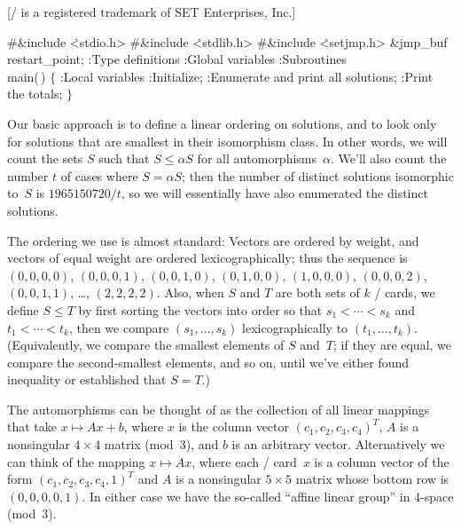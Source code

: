 [\SET/ is a registered trademark of SET Enterprises, Inc.]

\Y\B\8\#\&{include} \.{<stdio.h>}\6
\8\#\&{include} \.{<stdlib.h>}\6
\8\#\&{include} \.{<setjmp.h>}\6
\&{jmp\_buf} \\{restart\_point};\7
:Type definitions\X\6
:Global variables\X\6
:Subroutines\X\7
\\{main}(\,)\1\1\2\2\6
${}\{{}$\1\6
:Local variables\X\6
:Initialize\X;\6
:Enumerate and print all solutions\X;\6
:Print the totals\X;\6
\4${}\}{}$\2\par
\fi

Our basic approach is to define a linear ordering on
solutions, and to
look only for solutions that are smallest in their isomorphism class.
In other words, we will count the sets $S$ such that $S\le\alpha S$ for
all automorphisms~$\alpha$. We'll also count the number $t$ of cases where
$S=\alpha S$; then the number of distinct solutions isomorphic to~$S$
is $1965150720/t$, so we will essentially have also enumerated the distinct
solutions.

The ordering we use is almost standard: Vectors are ordered
by weight, and vectors of equal weight are ordered lexicographically;
thus the sequence is $(0,0,0,0)$, $(0,0,0,1)$, $(0,0,1,0)$, $(0,1,0,0)$,
$(1,0,0,0)$, $(0,0,0,2)$, $(0,0,1,1)$, \dots, $(2,2,2,2)$.
Also, when $S$ and $T$ are both sets of $k$ \SET/ cards, we define
$S\le T$ by first sorting the vectors into order so that $s_1<\cdots<s_k$ and
$t_1<\cdots<t_k$, then we compare $(s_1,\ldots,s_k)$ lexicographically
to $(t_1,\ldots,t_k)$. (Equivalently, we compare the smallest elements
of $S$ and~$T$; if they are equal, we compare the second-smallest elements,
and so on, until we've either found inequality or established that $S=T$.)

\fi

The automorphisms can be thought of as the collection of
all linear
mappings that take $x\mapsto Ax+b$, where $x$ is the column vector
$(c_1,c_2,c_3,c_4)^T$, $A$ is a nonsingular $4\times4$
matrix (mod~3), and $b$ is an arbitrary vector. Alternatively we can
think of the mapping $x\mapsto Ax$, where each \SET/ card~$x$ is a
column vector of the form $(c_1,c_2,c_3,c_4,1)^T$
and $A$ is a nonsingular $5\times5$ matrix whose bottom row is $(0,0,0,0,1)$.
In either case
we have the so-called ``affine linear group'' in 4-space (mod~3).

